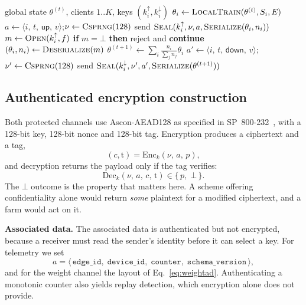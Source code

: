 \documentclass[conference]{IEEEtran}
\begin{document}
\begin{algorithm}[t]
\caption{One sealed federated round}\label{alg:round}
\begin{algorithmic}[1]
\Require global state $\theta^{(t)}$, clients $1..K$, keys $(k^{\uparrow}_i, k^{\downarrow}_i)$
  \State $\theta_i \gets \textsc{LocalTrain}(\theta^{(t)}, S_i, E)$
  \State $a \gets \langle i,\, t,\, \textsf{up},\, v \rangle$;\quad $\nu \gets \textsc{Csprng}(128)$
  \State send $\textsc{Seal}(k^{\uparrow}_i, \nu, a, \textsc{Serialize}(\theta_i, n_i))$
\EndFor
{}
  \State $m \gets \textsc{Open}(k^{\uparrow}_i, f)$
  \State \textbf{if} $m = \bot$ \textbf{then} reject and \textbf{continue} 
  \State $(\theta_i, n_i) \gets \textsc{Deserialize}(m)$
\EndFor
\State $\theta^{(t+1)} \gets \sum_i \frac{n_i}{\sum_j n_j}\theta_i$ 
  \State $a' \gets \langle i,\, t,\, \textsf{down},\, v \rangle$;\quad $\nu' \gets \textsc{Csprng}(128)$
  \State send $\textsc{Seal}(k^{\downarrow}_i, \nu', a', \textsc{Serialize}(\theta^{(t+1)}))$
\EndFor
\end{algorithmic}
\end{algorithm}

\subsection{Authenticated encryption construction}\label{sec:aead}
Both protected channels use Ascon-AEAD128 as specified in SP~800-232~\cite{nist2025sp800232},
with a 128-bit key, 128-bit nonce and 128-bit tag. Encryption produces a ciphertext and a tag,
\begin{equation}
(c, \mathrm{t}) = \mathrm{Enc}_{k}(\nu,\, a,\, p),
\label{eq:enc}
\end{equation}
and decryption returns the payload only if the tag verifies:
\begin{equation}
\mathrm{Dec}_{k}(\nu,\, a,\, c,\, \mathrm{t}) \in \{\, p,\; \bot \,\}.
\label{eq:dec}
\end{equation}
The $\bot$ outcome is the property that matters here. A scheme offering confidentiality alone
would return \emph{some} plaintext for a modified ciphertext, and a farm would act on it.

\textbf{Associated data.} The associated data is authenticated but not encrypted, because a
receiver must read the sender's identity before it can select a key. For telemetry we set
\begin{equation}
a = \langle\, \texttt{edge\_id},\; \texttt{device\_id},\;
\texttt{counter},\; \texttt{schema\_version} \,\rangle,
\label{eq:telemetryad}
\end{equation}
and for the weight channel the layout of Eq.~\eqref{eq:weightad}. Authenticating a monotonic
counter also yields replay detection, which encryption alone does not provide.
\end{document}
